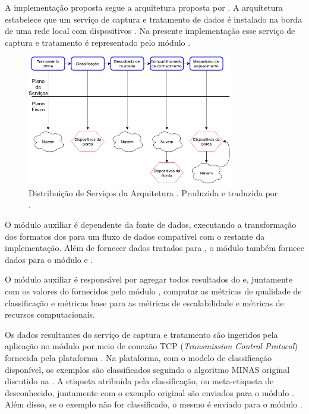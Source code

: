 
A implementação proposta segue a arquitetura \idsiot proposta por
.
A arquitetura \idsiot estabelece que um serviço de captura e tratamento de dados
é instalado na borda de uma rede local com dispositivos \iot.
Na presente implementação
esse serviço de captura e tratamento é representado pelo módulo \source.

\begin{figure}[ht]
  \centering
  \includegraphics[width=0.8\textwidth]{figuras/cassales-service-physical-pt.png}
  \caption{
    Distribuição de Serviços da Arquitetura \idsiot.
    Produzida e traduzida por .
  }
  \label{fig:ids-iot}
\end{figure}

O módulo auxiliar \source é dependente da fonte de dados, executando a transformação dos
formatos dos \datasets para um fluxo de dados compatível com o restante da
implementação.
Além de fornecer dados tratados para \mfog, o módulo \source também fornece
dados para o módulo \sink e \offline.

O módulo auxiliar \sink é responsável por agregar todos resultados do \mfog e, juntamente
com os valores do \dataset fornecidos pelo módulo \source, computar as métricas
de qualidade de classificação e métricas base para as métricas de
escalabilidade e métricas de recursos computacionais.

Os dados resultantes do serviço de captura e tratamento são ingeridos pela
aplicação no módulo \classify por meio de conexão TCP (\emph{Transmission
Control Protocol}) fornecida pela plataforma \flink.
Na plataforma, com o modelo de classificação disponível, os exemplos são
classificados seguindo o algoritmo MINAS original discutido na .
A etiqueta atribuída pela classificação, ou meta-etiqueta de desconhecido,
juntamente com o exemplo original são enviados para o módulo \sink.
Além disso, se o exemplo não for classificado, o mesmo é enviado para o módulo
\detector.

